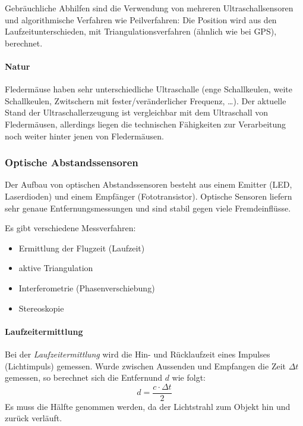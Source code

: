 					Gebräuchliche Abhilfen sind die Verwendung von mehreren Ultraschallsensoren und algorithmische Verfahren wie Peilverfahren: Die Position wird aus den Laufzeitunterschieden, \zB mit Triangulationsverfahren (ähnlich wie bei GPS), berechnet.

				\paragraph{Natur}
					Fledermäuse haben sehr unterschiedliche Ultraschalle (enge Schallkeulen, weite Schallkeulen, Zwitschern mit fester/veränderlicher Frequenz, \dots). Der aktuelle Stand der Ultraschallerzeugung ist vergleichbar mit dem Ultraschall von Fledermäusen, allerdings liegen die technischen Fähigkeiten zur Verarbeitung noch weiter hinter jenen von Fledermäusen.

			\subsubsection{Optische Abstandssensoren}
				Der Aufbau von optischen Abstandssensoren besteht aus einem Emitter (LED, Laserdioden) und einem Empfänger (Fototransistor). Optische Sensoren liefern sehr genaue Entfernungsmessungen und sind stabil gegen viele Fremdeinflüsse.

				Es gibt verschiedene Messverfahren:
				\begin{itemize}
					\item Ermittlung der Flugzeit (Laufzeit)
					\item aktive Triangulation
					\item Interferometrie (Phasenverschiebung)
					\item Stereoskopie
				\end{itemize}

				\paragraph{Laufzeitermittlung}
					Bei der \emph{Laufzeitermittlung} wird die Hin- und Rücklaufzeit eines Impulses (\zB Lichtimpuls) gemessen. Wurde zwischen Aussenden und Empfangen die Zeit \( \Delta t \) gemessen, so berechnet sich die Entfernund \(d\) wie folgt:
					\begin{equation*}
						d = \frac{c \cdot \Delta t}{2}
					\end{equation*}
					Es muss die Hälfte genommen werden, da der Lichtstrahl zum Objekt hin und zurück verläuft.

